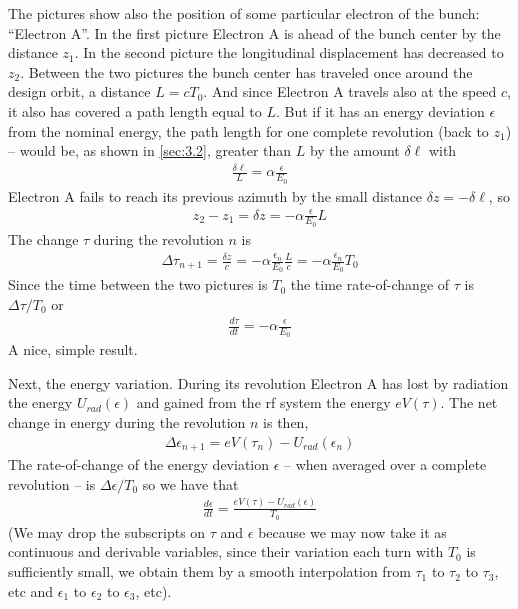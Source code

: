 The pictures show also the position of some particular electron of the bunch: “Electron A”. In the first picture Electron A is ahead of the bunch center by the distance $z_1$. In the second picture the longitudinal displacement has decreased to $z_2$. Between the two pictures the bunch center has traveled once around the design orbit, a distance $L=cT_0$. And since Electron A travels also at the speed $c$, it also has covered a path length equal to $L$. But if it has an energy deviation $\epsilon$ from the nominal energy, the path length for one complete revolution (back to $z_1$) -- would be, as shown in \autoref{sec:3.2}, greater than $L$ by the amount $\delta \ell$ with
\begin{align}
	\frac{\delta \ell}{L} = \alpha\frac{\epsilon}{E_0}
\end{align}
Electron A fails to reach its previous azimuth by the small distance $\delta z = -\delta \ell$, so
\begin{align}
	z_2 - z_1 = \delta z = -\alpha \frac{\epsilon}{E_0}L
\end{align}
The change $\tau$ during the revolution $n$ is
\begin{align}
	\Delta \tau_{n+1} = \frac{\delta z}{c} = -\alpha \frac{\epsilon_n}{E_0}\frac{L}{c} = -\alpha\frac{\epsilon_n}{E_0}T_0
\end{align}
Since the time between the two pictures is $T_0$ the time rate-of-change of $\tau$ is $\Delta \tau/T_0$ or
\begin{align}
	\frac{d \tau}{dt} = -\alpha \frac{\epsilon}{E_0}\label{eq:3.32}
\end{align}
A nice, simple result.

Next, the energy variation. During its revolution Electron A has lost by radiation the energy $U_{rad}(\epsilon)$ and gained from the rf system the energy $eV(\tau)$. The net change in energy during the revolution $n$ is then,
\begin{align}
	\Delta \epsilon_{n+1} = eV(\tau_n)-U_{rad}(\epsilon_n)
\end{align}
The rate-of-change of the energy deviation $\epsilon$ -- when averaged over a complete revolution -- is $\Delta \epsilon/T_0$ so we have that
\begin{align}
	\frac{d\epsilon}{dt} = \frac{eV(\tau)-U_{rad}(\epsilon)}{T_0}\label{eq:3.34}
\end{align}
(We may drop the subscripts on $\tau$ and $\epsilon$ because we may now take it as continuous and derivable variables, since their variation each turn with $T_0$ is sufficiently small, we obtain them by a smooth interpolation from $\tau_1$ to $\tau_2$ to $\tau_3$, etc and $\epsilon_1$ to $\epsilon_2$ to $\epsilon_3$, etc).

